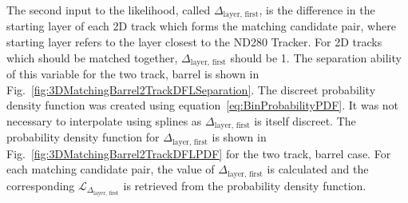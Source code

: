\newline
\newline
The second input to the likelihood, called $\Delta_{\textrm{layer, first}}$, is the difference in the starting layer of each 2D track which forms the matching candidate pair, where starting layer refers to the layer closest to the ND280 Tracker.  For 2D tracks which should be matched together, $\Delta_{\textrm{layer, first}}$ should be 1.  The separation ability of this variable for the two track, barrel is shown in Fig.~\ref{fig:3DMatchingBarrel2TrackDFLSeparation}.  The discreet probability density function was created using equation~\ref{eq:BinProbabilityPDF}.  It was not necessary to interpolate using splines as $\Delta_{\textrm{layer, first}}$ is itself discreet.  The probability density function for $\Delta_{\textrm{layer, first}}$ is shown in Fig.~\ref{fig:3DMatchingBarrel2TrackDFLPDF} for the two track, barrel case.  For each matching candidate pair, the value of $\Delta_{\textrm{layer, first}}$ is calculated and the corresponding $\mathcal{L}_{\Delta_{\textrm{layer, first}}}$ is retrieved from the probability density function.
